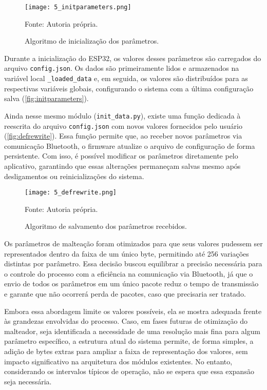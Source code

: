 \begin{figure}[ht]
    \centering
    \caption{Algoritmo de inicialização dos parâmetros.}
    \label{fig:initparameters}
    \texttt{[image: 5\_initparameters.png]}

    {\centering\footnotesize Fonte: Autoria própria.\par}
\end{figure}

Durante a inicialização do ESP32, os valores desses parâmetros são carregados do arquivo \texttt{config.json}. Os dados são primeiramente lidos e armazenados na variável local \texttt{\_loaded\_data} e, em seguida, os valores são distribuídos para as respectivas variáveis globais, configurando o sistema com a última configuração salva (\autoref{fig:initparameters}).

Ainda nesse mesmo módulo (\texttt{init\_data.py}), existe uma função dedicada à reescrita do arquivo \texttt{config.json} com novos valores fornecidos pelo usuário (\autoref{fig:defrewrite}). Essa função permite que, ao receber novos parâmetros via comunicação Bluetooth, o firmware atualize o arquivo de configuração de forma persistente. Com isso, é possível modificar os parâmetros diretamente pelo aplicativo, garantindo que essas alterações permaneçam salvas mesmo após desligamentos ou reinicializações do sistema.

\begin{figure}[ht]
    \centering
    \caption{Algoritmo de salvamento dos parâmetros recebidos.}
    \label{fig:defrewrite}
    \texttt{[image: 5\_defrewrite.png]}

    {\centering\footnotesize Fonte: Autoria própria.\par}
\end{figure}

Os parâmetros de malteação foram otimizados para que seus valores pudessem ser representados dentro da faixa de um único byte, permitindo até 256 variações distintas por parâmetro. Essa decisão buscou equilibrar a precisão necessária para o controle do processo com a eficiência na comunicação via Bluetooth, já que o envio de todos os parâmetros em um único pacote reduz o tempo de transmissão e garante que não ocorrerá perda de pacotes, caso que precisaria ser tratado.

Embora essa abordagem limite os valores possíveis, ela se mostra adequada frente às grandezas envolvidas do processo. Caso, em fases futuras de otimização do malteador, seja identificada a necessidade de uma resolução mais fina para algum parâmetro específico, a estrutura atual do sistema permite, de forma simples, a adição de bytes extras para ampliar a faixa de representação dos valores, sem impacto significativo na arquitetura dos módulos existentes. No entanto, considerando os intervalos típicos de operação, não se espera que essa expansão seja necessária.

